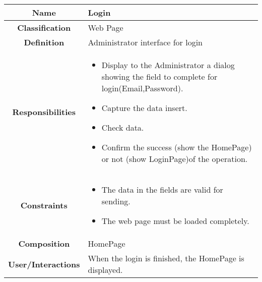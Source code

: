 \documentclass[11pt, a4paper,titlepage]{article}
\begin{document}
\begin{enumerate}
\begin{tabularx}{\textwidth}{| c | X |}
	\hline
	\textbf{Name} & 
	Login
	\\
	\hline
	\textbf{Classification} & 
	Web Page
	\\
	\hline
	\textbf{Definition} & 
	Administrator interface for login
	\\
	\hline
	\textbf{Responsibilities} &
	\begin{itemize}
		\item Display to the Administrator a dialog showing the field to complete for login(Email,Password).
		\item  Capture the data insert.
		\item Check data.
		\item Confirm the success (show the HomePage) or not (show LoginPage)of the operation.
	\end{itemize}
	\\
	\hline
	\textbf{Constraints} & 
	\begin{itemize}
		\item  The data in the fields are valid for sending.
		\item The web page must be loaded completely.
	\end{itemize}
	\\
	\hline
	\textbf{Composition} & 
	HomePage
	\\
	\hline
	\textbf{User/Interactions} & 
	When the login is finished, the HomePage is displayed.
	\\
	\hline	
\end{tabularx}


\end{enumerate}
\end{document}
